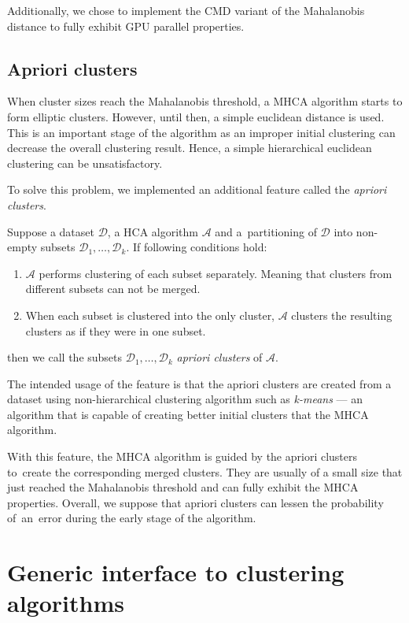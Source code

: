 Additionally, we chose to implement the CMD variant of the Mahalanobis distance to fully exhibit GPU parallel properties.

\subsection{Apriori clusters}

When cluster sizes reach the Mahalanobis threshold, a MHCA algorithm starts to form elliptic clusters. However, until then, a simple euclidean distance is used. This is an important stage of the algorithm as an improper initial clustering can decrease the overall clustering result. Hence, a simple hierarchical euclidean clustering can be unsatisfactory.

To solve this problem, we implemented an additional feature called the \emph{apriori clusters}. 

\begin{defn}
	Suppose a dataset $\mathcal{D}$, a HCA algorithm $\mathcal{A}$ and a~partitioning of  $\mathcal{D}$ into non-empty subsets $\mathcal{D}_1,\dots,\mathcal{D}_k$. If following conditions hold:
	\begin{enumerate}
		\item $\mathcal{A}$ performs clustering of each subset separately. Meaning that clusters from different subsets can not be merged.
		\item When each subset is clustered into the only cluster, $\mathcal{A}$ clusters the resulting clusters as if they were in one subset.
	\end{enumerate}
	then we call the subsets $\mathcal{D}_1,\dots,\mathcal{D}_k$ \emph{apriori clusters} of $\mathcal{A}$.
	\label{def03:apriori}
\end{defn}

The intended usage of the feature is that the apriori clusters are created from a dataset using non-hierarchical clustering algorithm such as \emph{k-means} --- an algorithm that is capable of creating better initial clusters that the MHCA algorithm.

With this feature, the MHCA algorithm is guided by the apriori clusters to~create the corresponding merged clusters. They are usually of a small size that just reached the Mahalanobis threshold and can fully exhibit the MHCA properties. Overall, we suppose that apriori clusters can lessen the probability of~an~error during the early stage of the algorithm.

\section{Generic interface to clustering algorithms}

